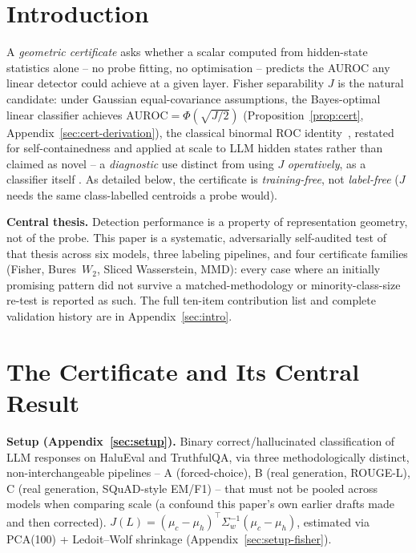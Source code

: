 \documentclass[onecolumn]{jmlr}
\begin{document}
\section{Introduction}
\label{sec:intro-compact}

A \emph{geometric certificate} asks whether a scalar computed from
hidden-state statistics alone -- no probe fitting, no optimisation --
predicts the AUROC any linear detector could achieve at a given layer.
Fisher separability $J$ is the natural candidate: under Gaussian
equal-covariance assumptions, the Bayes-optimal linear classifier
achieves $\text{AUROC}=\Phi(\sqrt{J/2})$ (Proposition~\ref{prop:cert},
Appendix~\ref{sec:cert-derivation}), the classical binormal ROC
identity~\citep{green1966signal,bamber1975area,hanley1982meaning},
restated for self-containedness and applied at scale to LLM hidden
states rather than claimed as novel -- a \emph{diagnostic} use distinct
from using $J$ \emph{operatively}, as a classifier itself
\citep{ricco2026geometric}. As detailed below, the certificate is
\emph{training-free}, not \emph{label-free} ($J$ needs the same
class-labelled centroids a probe would).

\textbf{Central thesis.} Detection performance is a property of
representation geometry, not of the probe. This paper is a systematic,
adversarially self-audited test of that thesis across six models,
three labeling pipelines, and four certificate families (Fisher,
Bures~$W_2$, Sliced Wasserstein, MMD): every case where an initially
promising pattern did not survive a matched-methodology or
minority-class-size re-test is reported as such. The full ten-item
contribution list and complete validation history are in
Appendix~\ref{sec:intro}.

\section{The Certificate and Its Central Result}
\label{sec:central}

\textbf{Setup (Appendix~\ref{sec:setup}).} Binary correct/hallucinated
classification of LLM responses on HaluEval and TruthfulQA, via three
methodologically distinct, non-interchangeable pipelines -- A
(forced-choice), B (real generation, ROUGE-L), C (real generation,
SQuAD-style EM/F1) -- that must not be pooled across models when
comparing scale (a confound this paper's own earlier drafts made and
then corrected). $J(L) = (\mu_c-\mu_h)^\top\Sigma_w^{-1}(\mu_c-\mu_h)$,
estimated via PCA(100) + Ledoit--Wolf shrinkage
(Appendix~\ref{sec:setup-fisher}).
\end{document}
